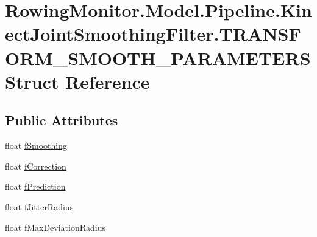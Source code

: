\hypertarget{struct_rowing_monitor_1_1_model_1_1_pipeline_1_1_kinect_joint_smoothing_filter_1_1_t_r_a_n_s_f_o9fb8ee9e37e15ee7ab8d318a72b8984e}{}\section{Rowing\+Monitor.\+Model.\+Pipeline.\+Kinect\+Joint\+Smoothing\+Filter.\+T\+R\+A\+N\+S\+F\+O\+R\+M\+\_\+\+S\+M\+O\+O\+T\+H\+\_\+\+P\+A\+R\+A\+M\+E\+T\+E\+RS Struct Reference}
\label{struct_rowing_monitor_1_1_model_1_1_pipeline_1_1_kinect_joint_smoothing_filter_1_1_t_r_a_n_s_f_o9fb8ee9e37e15ee7ab8d318a72b8984e}
\subsection*{Public Attributes}
\begin{DoxyCompactItemize}
\item 
float \hyperlink{struct_rowing_monitor_1_1_model_1_1_pipeline_1_1_kinect_joint_smoothing_filter_1_1_t_r_a_n_s_f_o9fb8ee9e37e15ee7ab8d318a72b8984e_a5fd02a9b999cbcc12ad1a22763adb8cd}{f\+Smoothing}
\item 
float \hyperlink{struct_rowing_monitor_1_1_model_1_1_pipeline_1_1_kinect_joint_smoothing_filter_1_1_t_r_a_n_s_f_o9fb8ee9e37e15ee7ab8d318a72b8984e_a7303c0fbcd8a80670f7ddd5f46c0d49c}{f\+Correction}
\item 
float \hyperlink{struct_rowing_monitor_1_1_model_1_1_pipeline_1_1_kinect_joint_smoothing_filter_1_1_t_r_a_n_s_f_o9fb8ee9e37e15ee7ab8d318a72b8984e_a4cc3828d097b5b63f71f004f2034ba79}{f\+Prediction}
\item 
float \hyperlink{struct_rowing_monitor_1_1_model_1_1_pipeline_1_1_kinect_joint_smoothing_filter_1_1_t_r_a_n_s_f_o9fb8ee9e37e15ee7ab8d318a72b8984e_aa4a54259125f5677ef2b7a149402e268}{f\+Jitter\+Radius}
\item 
float \hyperlink{struct_rowing_monitor_1_1_model_1_1_pipeline_1_1_kinect_joint_smoothing_filter_1_1_t_r_a_n_s_f_o9fb8ee9e37e15ee7ab8d318a72b8984e_a01f36a8e40cd63c55161e3df85de9196}{f\+Max\+Deviation\+Radius}
\end{DoxyCompactItemize}


